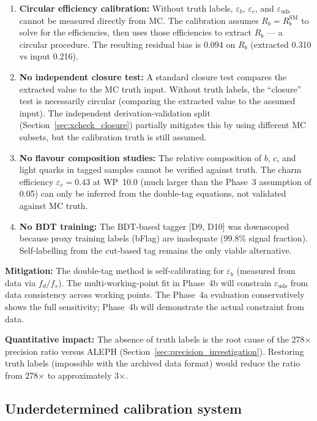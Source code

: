 \documentclass[11pt,a4paper]{article}
\begin{document}
\begin{enumerate}
\item \textbf{Circular efficiency calibration:} Without truth labels, $\varepsilon_b$,
$\varepsilon_c$, and $\varepsilon_\mathrm{uds}$ cannot be measured directly from MC.
The calibration assumes $R_b = R_b^\mathrm{SM}$ to solve for the efficiencies, then
uses those efficiencies to extract $R_b$ --- a circular procedure. The resulting
residual bias is 0.094 on $R_b$ (extracted 0.310 vs input 0.216).

\item \textbf{No independent closure test:} A standard closure test compares the
extracted value to the MC truth input. Without truth labels, the ``closure'' test
is necessarily circular (comparing the extracted value to the assumed input). The
independent derivation-validation split (Section~\ref{sec:xcheck_closure}) partially
mitigates this by using different MC subsets, but the calibration truth is still
assumed.

\item \textbf{No flavour composition studies:} The relative composition of $b$, $c$,
and light quarks in tagged samples cannot be verified against truth. The charm
efficiency $\varepsilon_c = 0.43$ at WP~10.0 (much larger than the Phase~3 assumption
of 0.05) can only be inferred from the double-tag equations, not validated against
MC truth.

\item \textbf{No BDT training:} The BDT-based tagger [D9, D10] was downscoped
because proxy training labels (bFlag) are inadequate (99.8\% signal fraction).
Self-labelling from the cut-based tag remains the only viable alternative.
\end{enumerate}

\textbf{Mitigation:} The double-tag method is self-calibrating for $\varepsilon_b$
(measured from data via $f_d / f_s$). The multi-working-point fit in Phase~4b will
constrain $\varepsilon_\mathrm{uds}$ from data consistency across working points.
The Phase~4a evaluation conservatively shows the full sensitivity; Phase~4b will
demonstrate the actual constraint from data.

\textbf{Quantitative impact:} The absence of truth labels is the root cause of
the 278$\times$ precision ratio versus ALEPH (Section~\ref{sec:precision_investigation}).
Restoring truth labels (impossible with the archived data format) would reduce the
ratio from 278$\times$ to approximately 3$\times$.

\subsection{Underdetermined calibration system}
\end{document}
